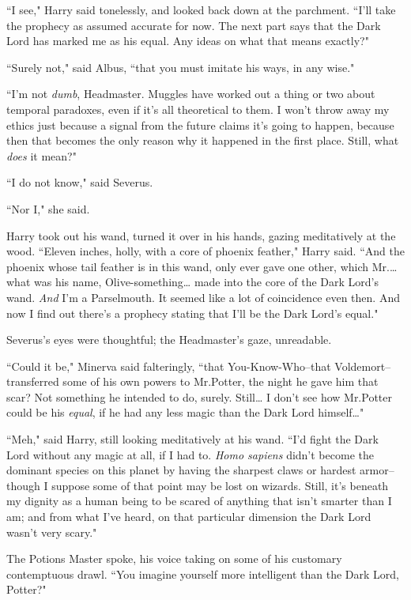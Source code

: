 ``I see," Harry said tonelessly, and looked back down at the parchment. ``I'll take the prophecy as assumed accurate for now. The next part says that the Dark Lord has marked me as his equal. Any ideas on what that means exactly?"

``Surely not," said Albus, ``that you must imitate his ways, in any wise."

``I'm not \emph{dumb}, Headmaster. Muggles have worked out a thing or two about temporal paradoxes, even if it's all theoretical to them. I won't throw away my ethics just because a signal from the future claims it's going to happen, because then that becomes the only reason why it happened in the first place. Still, what \emph{does} it mean?"

``I do not know," said Severus.

``Nor I," she said.

Harry took out his wand, turned it over in his hands, gazing meditatively at the wood. ``Eleven inches, holly, with a core of phoenix feather," Harry said. ``And the phoenix whose tail feather is in this wand, only ever gave one other, which Mr.{\ldots} what was his name, Olive-something{\ldots} made into the core of the Dark Lord's wand. \emph{And} I'm a Parselmouth. It seemed like a lot of coincidence even then. And now I find out there's a prophecy stating that I'll be the Dark Lord's equal."

Severus's eyes were thoughtful; the Headmaster's gaze, unreadable.

``Could it be," Minerva said falteringly, ``that You-Know-Who\---that Voldemort\---transferred some of his own powers to Mr.\?Potter, the night he gave him that scar? Not something he intended to do, surely. Still{\ldots} I don't see how Mr.\?Potter could be his \emph{equal}, if he had any less magic than the Dark Lord himself{\ldots}"

``Meh," said Harry, still looking meditatively at his wand. ``I'd fight the Dark Lord without any magic at all, if I had to. \emph{Homo sapiens} didn't become the dominant species on this planet by having the sharpest claws or hardest armor\---though I suppose some of that point may be lost on wizards. Still, it's beneath my dignity as a human being to be scared of anything that isn't smarter than I am; and from what I've heard, on that particular dimension the Dark Lord wasn't very scary."

The Potions Master spoke, his voice taking on some of his customary contemptuous drawl. ``You imagine yourself more intelligent than the Dark Lord, Potter?"

